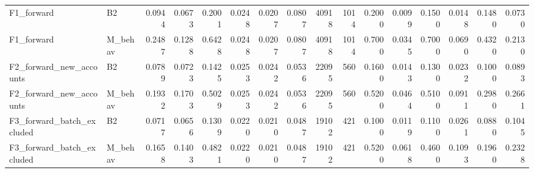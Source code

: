 \begin{table}
\begin{tabular}{llrrrrrrrrrrrrrr}
F1\_forward & B2 & 0.0944 & 0.0673 & 0.2001 & 0.0248 & 0.0207 & 0.0807 & 40918 & 1014 & 0.2000 & 0.0099 & 0.1500 & 0.0148 & 0.1480 & 0.0730 \\
F1\_forward & M\_behav & 0.2487 & 0.1288 & 0.6428 & 0.0248 & 0.0207 & 0.0807 & 40918 & 1014 & 0.7000 & 0.0345 & 0.7000 & 0.0690 & 0.4320 & 0.2130 \\
F2\_forward\_new\_accounts & B2 & 0.0789 & 0.0723 & 0.1425 & 0.0253 & 0.0242 & 0.0536 & 22095 & 560 & 0.1600 & 0.0143 & 0.1300 & 0.0232 & 0.1000 & 0.0893 \\
F2\_forward\_new\_accounts & M\_behav & 0.1932 & 0.1703 & 0.5029 & 0.0253 & 0.0242 & 0.0536 & 22095 & 560 & 0.5200 & 0.0464 & 0.5100 & 0.0911 & 0.2980 & 0.2661 \\
F3\_forward\_batch\_excluded & B2 & 0.0717 & 0.0656 & 0.1309 & 0.0220 & 0.0210 & 0.0487 & 19102 & 421 & 0.1000 & 0.0119 & 0.1100 & 0.0261 & 0.0880 & 0.1045 \\
F3\_forward\_batch\_excluded & M\_behav & 0.1658 & 0.1403 & 0.4821 & 0.0220 & 0.0210 & 0.0487 & 19102 & 421 & 0.5200 & 0.0618 & 0.4600 & 0.1093 & 0.1960 & 0.2328 \\
\bottomrule
\end{tabular}
\end{table}
